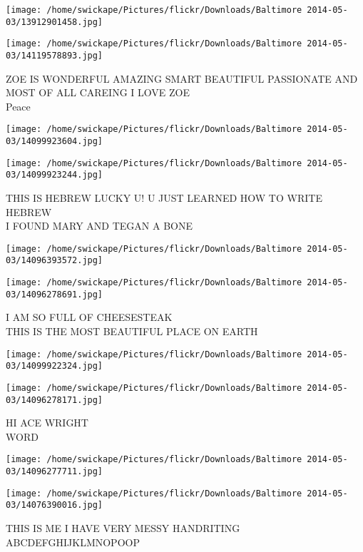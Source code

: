 \documentclass[10pt,letterpaper]{article}
\begin{document}
\texttt{[image: /home/swickape/Pictures/flickr/Downloads/Baltimore 2014-05-03/13912901458.jpg]}

\vspace{0.25in}
\texttt{[image: /home/swickape/Pictures/flickr/Downloads/Baltimore 2014-05-03/14119578893.jpg]}

ZOE IS WONDERFUL AMAZING SMART BEAUTIFUL PASSIONATE AND MOST OF ALL CAREING I LOVE ZOE\\
Peace
\pagebreak

\texttt{[image: /home/swickape/Pictures/flickr/Downloads/Baltimore 2014-05-03/14099923604.jpg]}

\vspace{0.25in}
\texttt{[image: /home/swickape/Pictures/flickr/Downloads/Baltimore 2014-05-03/14099923244.jpg]}

THIS IS HEBREW LUCKY U! U JUST LEARNED HOW TO WRITE HEBREW\\
I FOUND MARY AND TEGAN A BONE
\pagebreak

\texttt{[image: /home/swickape/Pictures/flickr/Downloads/Baltimore 2014-05-03/14096393572.jpg]}

\vspace{0.25in}
\texttt{[image: /home/swickape/Pictures/flickr/Downloads/Baltimore 2014-05-03/14096278691.jpg]}

I AM SO FULL OF CHEESESTEAK\\
THIS IS THE MOST BEAUTIFUL PLACE ON EARTH
\pagebreak

\texttt{[image: /home/swickape/Pictures/flickr/Downloads/Baltimore 2014-05-03/14099922324.jpg]}

\vspace{0.25in}
\texttt{[image: /home/swickape/Pictures/flickr/Downloads/Baltimore 2014-05-03/14096278171.jpg]}

HI ACE WRIGHT\\
WORD
\pagebreak

\texttt{[image: /home/swickape/Pictures/flickr/Downloads/Baltimore 2014-05-03/14096277711.jpg]}

\vspace{0.25in}
\texttt{[image: /home/swickape/Pictures/flickr/Downloads/Baltimore 2014-05-03/14076390016.jpg]}

THIS IS ME I HAVE VERY MESSY HANDRITING\\
ABCDEFGHIJKLMNOPOOP
\pagebreak
\end{document}
